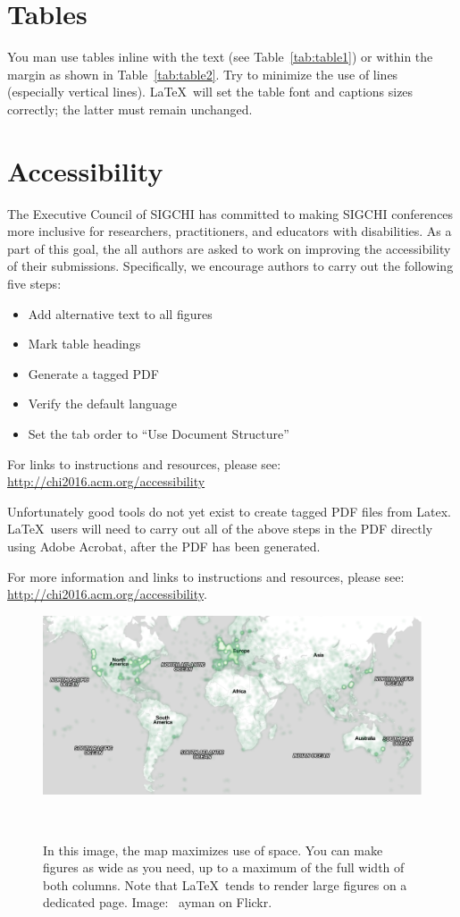 \documentclass{sigchi-ext}
\begin{document}
\section{Tables}
You man use tables inline with the text (see Table~\ref{tab:table1})
or within the margin as shown in Table~\ref{tab:table2}. Try to
minimize the use of lines (especially vertical lines). \LaTeX\ will
set the table font and captions sizes correctly; the latter must
remain unchanged.

\section{Accessibility}
The Executive Council of SIGCHI has committed to making SIGCHI
conferences more inclusive for researchers, practitioners, and
educators with disabilities. As a part of this goal, the all authors
are asked to work on improving the accessibility of their
submissions. Specifically, we encourage authors to carry out the
following five steps:
\begin{itemize}\compresslist%
\item Add alternative text to all figures
\item Mark table headings
\item Generate a tagged PDF
\item Verify the default language
\item Set the tab order to ``Use Document Structure''
\end{itemize}

For links to instructions and resources, please see:
\url{http://chi2016.acm.org/accessibility}

Unfortunately good tools do not yet exist to create tagged PDF files
from Latex. \LaTeX\ users will need to carry out all of the above
steps in the PDF directly using Adobe Acrobat, after the PDF has been
generated.

For more information and links to instructions and resources, please
see:
\url{http://chi2016.acm.org/accessibility}.

\begin{figure}
  \centering
  \includegraphics[width=1.4\columnwidth]{figures/map}
  \caption{In this image, the map maximizes use of space. You can make
    figures as wide as you need, up to a maximum of the full width of
    both columns. Note that \LaTeX\ tends to render large figures on a
    dedicated page. Image: \ccbynd~ayman on Flickr.}~\label{fig:cats}
\end{figure}
\end{document}
